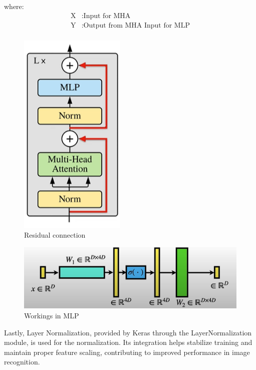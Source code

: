 where:
\begin{align*}
    \text{X} & : \text{Input for MHA}                 \\
    \text{Y} & : \text{Output from MHA Input for MLP} \\
\end{align*}
\begin{figure}[htbp]
    \centering
    \includegraphics[width=2in]{img/residual connection.png}
    \caption{{Residual connection}}
\end{figure}
\begin{figure}[htbp]
    \centering
    \includegraphics[width=5.5in]{img/MLP workings.png}
    \caption{{Workings in MLP}}
\end{figure}

Lastly, Layer Normalization, provided by Keras through the LayerNormalization module, is used for the normalization. Its integration helps stabilize training and maintain proper feature scaling, contributing to improved performance in image recognition.

\newpage